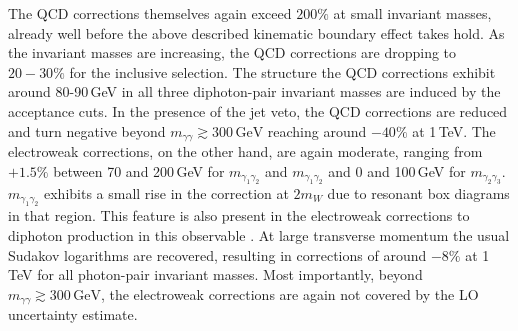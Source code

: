 The QCD corrections themselves again exceed $200\%$ at 
small invariant masses, already well before the above 
described kinematic boundary effect takes hold. 
As the invariant masses are increasing, the 
QCD corrections are dropping to $20-30\%$ for the inclusive 
selection. 
The structure the QCD corrections exhibit around 80-90\,GeV 
in all three diphoton-pair invariant masses are induced by 
the acceptance cuts.
In the presence of the jet veto, the QCD corrections are 
reduced and turn negative beyond $m_{\gamma\gamma}\gtrsim 300\,\text{GeV}$ 
reaching around $-40\%$ at 1\,TeV. 
The electroweak corrections, on the other hand, are 
again moderate, ranging from $+1.5\%$ between 70 and 200\,GeV 
for $m_{\gamma_1\gamma_2}$ and $m_{\gamma_1\gamma_2}$ and 
0 and 100\,GeV for $m_{\gamma_2\gamma_3}$. 
$m_{\gamma_1\gamma_2}$ exhibits a small rise in the correction 
at $2m_W$ due to resonant box diagrams in that region. 
This feature is also present in the electroweak corrections 
to diphoton production in this observable \cite{Chiesa:2017gqx}. 
At large transverse momentum the usual Sudakov logarithms 
are recovered, resulting in corrections of around 
$-8\%$ at 1\,TeV for all photon-pair invariant masses. 
Most importantly, beyond $m_{\gamma\gamma}\gtrsim 300\,\text{GeV}$, 
the electroweak corrections are again not covered by the LO 
uncertainty estimate.

